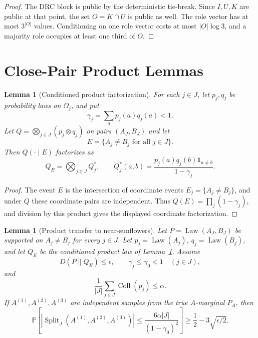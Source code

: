 \documentclass[11pt]{article}
\newtheorem{lemma}[theorem]{Lemma}
\newcommand{\Prb}{\mathbb P}
\newcommand{\Coll}{\operatorname{Coll}}
\newcommand{\Split}{\operatorname{Split}}
\newcommand{\Law}{\operatorname{Law}}
\begin{document}
\begin{proof}
The DRC block is public by the deterministic tie-break.  Since $I,U,K$ are
public at that point, the set $O=K\cap U$ is public as well.  The role vector
has at most $3^{|O|}$ values.  Conditioning on one role vector costs at most
$|O|\log 3$, and a majority role occupies at least one third of $O$.
\end{proof}

\section{Close-Pair Product Lemmas}
\label{sec:close-product}

\begin{lemma}[Conditioned product factorization]
\label{lem:conditioned-product}
For each $j\in J$, let $p_j,q_j$ be probability laws on $\Omega_j$, and put
\[
  \gamma_j=\sum_a p_j(a)q_j(a)<1.
\]
Let $Q=\bigotimes_{j\in J}(p_j\otimes q_j)$ on pairs $(A_J,B_J)$ and let
\[
  E=\{A_j\ne B_j\text{ for all }j\in J\}.
\]
Then $Q(\cdot\mid E)$ factorizes as
\[
  Q_E=\bigotimes_{j\in J}Q_j^*,
  \qquad
  Q_j^*(a,b)=
  \frac{p_j(a)q_j(b)\mathbf 1_{a\ne b}}{1-\gamma_j}.
\]
\end{lemma}

\begin{proof}
The event $E$ is the intersection of coordinate events $E_j=\{A_j\ne B_j\}$,
and under $Q$ these coordinate pairs are independent.  Thus
$Q(E)=\prod_j(1-\gamma_j)$, and division by this product gives the displayed
coordinate factorization.
\end{proof}

\begin{lemma}[Product transfer to near-sunflowers]
\label{lem:product-near-sunflower}
Let $P=\Law(A_J,B_J)$ be supported on $A_j\ne B_j$ for every $j\in J$.  Let
$p_j=\Law(A_j)$, $q_j=\Law(B_j)$, and let $Q_E$ be the conditioned product
law of Lemma~\ref{lem:conditioned-product}.  Assume
\[
  D(P\|Q_E)\le \epsilon,\qquad
  \gamma_j\le \gamma_0<1\quad(j\in J),
\]
and
\[
  \frac1{|J|}\sum_{j\in J}\Coll(p_j)\le \alpha.
\]
If $A^{(1)},A^{(2)},A^{(3)}$ are independent samples from the true
$A$-marginal $P_A$, then
\[
  \Prb\!\left[
    |\Split_J(A^{(1)},A^{(2)},A^{(3)})|
    \le
    \frac{6\alpha |J|}{(1-\gamma_0)^2}
  \right]
  \ge
  \frac12-3\sqrt{\epsilon/2}.
\]
\end{lemma}
\end{document}
